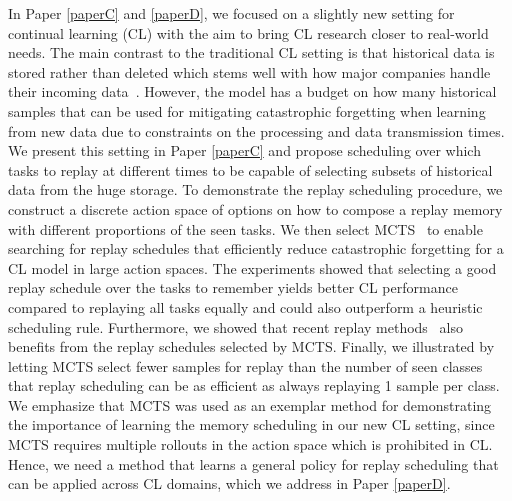 In Paper \ref{paperC} and \ref{paperD}, we focused on a slightly new setting for continual learning (CL) with the aim to bring CL research closer to real-world needs. The main contrast to the traditional CL setting is that historical data is stored rather than deleted which stems well with how major companies handle their incoming data~\cite{bronson2015open, asta2016observability}. However, the model has a budget on how many historical samples that can be used for mitigating catastrophic forgetting when learning from new data due to constraints on the processing and data transmission times. We present this setting in Paper \ref{paperC} and propose scheduling over which tasks to replay at different times to be capable of selecting subsets of historical data from the huge storage. To demonstrate the replay scheduling procedure, we construct a discrete action space of options on how to compose a replay memory with different proportions of the seen tasks. We then select MCTS~\cite{coulom2006efficient, browne2012survey} to enable searching for replay schedules that efficiently reduce catastrophic forgetting for a CL model in large action spaces. The experiments showed that selecting a good replay schedule over the tasks to remember yields better CL performance compared to replaying all tasks equally and could also outperform a heuristic scheduling rule. Furthermore, we showed that recent replay methods~\cite{chaudhry2021using, riemer2018learning, buzzega2020dark} also benefits from the replay schedules selected by MCTS. Finally, we illustrated by letting MCTS select fewer samples for replay than the number of seen classes that replay scheduling can be as efficient as always replaying 1 sample per class. We emphasize that MCTS was used as an exemplar method for demonstrating the importance of learning the memory scheduling in our new CL setting, since MCTS requires multiple rollouts in the action space which is prohibited in CL. Hence, we need a method that learns a general policy for replay scheduling that can be applied across CL domains, which we address in Paper \ref{paperD}.

